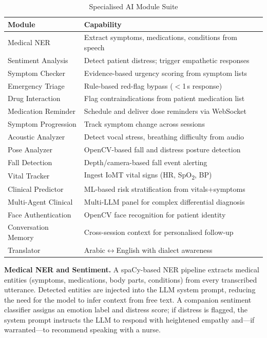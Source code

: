 \documentclass[conference]{IEEEtran}
\begin{document}
\begin{table}[t]
\caption{Specialised AI Module Suite}
\label{tab:aimodules}
\centering
\renewcommand{\arraystretch}{1.1}
\begin{tabular}{p{3.2cm}p{4.4cm}}
\toprule
\textbf{Module} & \textbf{Capability} \\
\midrule
Medical NER            & Extract symptoms, medications, conditions from speech \\
Sentiment Analysis     & Detect patient distress; trigger empathetic responses \\
Symptom Checker        & Evidence-based urgency scoring from symptom lists \\
Emergency Triage       & Rule-based red-flag bypass ($<$1\,s response) \\
Drug Interaction       & Flag contraindications from patient medication list \\
Medication Reminder    & Schedule and deliver dose reminders via WebSocket \\
Symptom Progression    & Track symptom change across sessions \\
Acoustic Analyzer      & Detect vocal stress, breathing difficulty from audio \\
Pose Analyzer          & OpenCV-based fall and distress posture detection \\
Fall Detection         & Depth/camera-based fall event alerting \\
Vital Tracker          & Ingest IoMT vital signs (HR, SpO\textsubscript{2}, BP) \\
Clinical Predictor     & ML-based risk stratification from vitals+symptoms \\
Multi-Agent Clinical   & Multi-LLM panel for complex differential diagnosis \\
Face Authentication    & OpenCV face recognition for patient identity \\
Conversation Memory    & Cross-session context for personalised follow-up \\
Translator             & Arabic$\leftrightarrow$English with dialect awareness \\
\bottomrule
\end{tabular}
\end{table}

\textbf{Medical NER and Sentiment.}
A spaCy-based NER pipeline extracts medical entities (symptoms, medications,
body parts, conditions) from every transcribed utterance.
Detected entities are injected into the LLM system prompt, reducing the need
for the model to infer context from free text.
A companion sentiment classifier assigns an emotion label and distress score;
if distress is flagged, the system prompt instructs the LLM to respond with
heightened empathy and—if warranted—to recommend speaking with a nurse.
\end{document}
